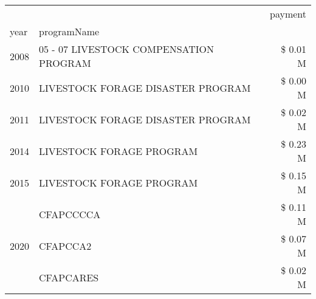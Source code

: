 \begin{tabular}{llr}
\toprule
 &  & payment \\
year & programName &  \\
\midrule
2008 & 05 - 07 LIVESTOCK COMPENSATION PROGRAM & \$ 0.01 M \\
\cline{1-3}
2010 & LIVESTOCK FORAGE DISASTER  PROGRAM & \$ 0.00 M \\
\cline{1-3}
2011 & LIVESTOCK FORAGE DISASTER PROGRAM & \$ 0.02 M \\
\cline{1-3}
2014 & LIVESTOCK FORAGE PROGRAM & \$ 0.23 M \\
\cline{1-3}
2015 & LIVESTOCK FORAGE PROGRAM & \$ 0.15 M \\
\cline{1-3}
\multirow[t]{3}{*}{2020} & CFAPCCCCA & \$ 0.11 M \\
 & CFAPCCA2 & \$ 0.07 M \\
 & CFAPCARES & \$ 0.02 M \\
\cline{1-3}
\bottomrule
\end{tabular}
